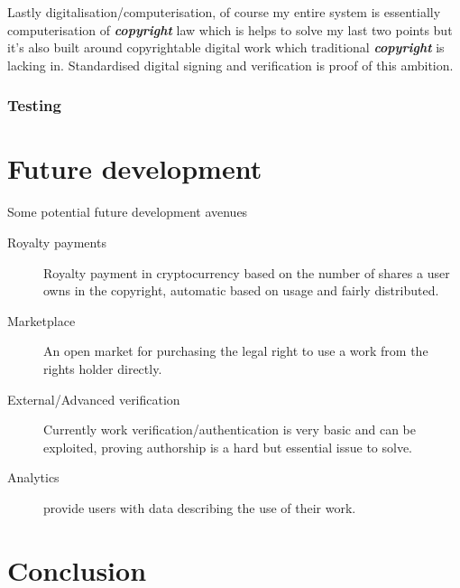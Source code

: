 \documentclass[12pt]{article}
\newcommand{\keyword}[1]{\textbf{\textit{#1}}}
\begin{document}
Lastly digitalisation/computerisation, of course my entire system is essentially computerisation of \keyword{copyright} law which is helps to solve my last two points but it's also built around copyrightable digital work which traditional \keyword{copyright} is lacking in. Standardised digital signing and verification is proof of this ambition.


\subsubsection{Testing}

\section{Future development}

Some potential future development avenues
\begin{description}
	\item[Royalty payments] Royalty payment in cryptocurrency based on the number of shares a user owns in the copyright, automatic based on usage and fairly distributed.
	\item[Marketplace] An open market for purchasing the legal right to use a work from the rights holder directly.
	\item[External/Advanced verification] Currently work verification/authentication is very basic and can be exploited, proving authorship is a hard but essential issue to solve.
	\item[Analytics] provide users with data describing the use of their work.
\end{description}

\section{Conclusion}





\end{document}
